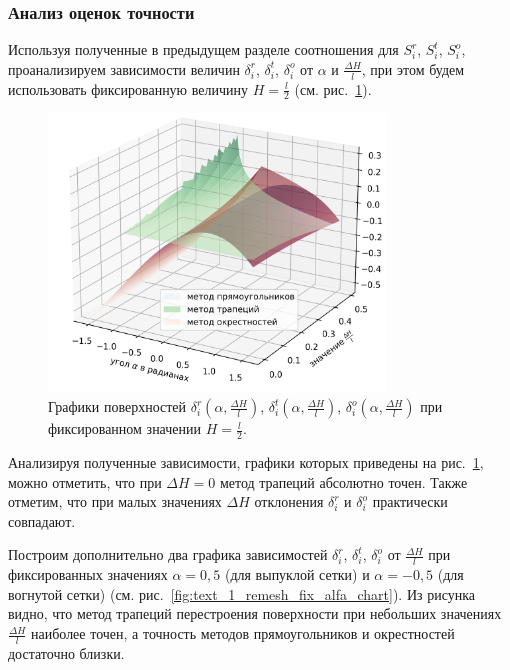\subsubsection{Анализ оценок точности}

Используя полученные в предыдущем разделе соотношения для $S_i^r$, $S_i^t$, $S_i^o$, проанализируем зависимости величин $\delta_i^r$, $\delta_i^t$, $\delta_i^o$ от $\alpha$ и $\frac{\Delta H}{l}$, при этом будем использовать фиксированную величину $H = \frac{l}{2}$ (см. рис.~\ref{fig:text_1_remesh_3d_main_chart}).

\begin{figure}[ht]
\centering
\includegraphics[width=0.8\textwidth]{fig/2dr_remesh_3d_chart.png}
\singlespacing
{}\caption{Графики поверхностей $\delta_i^r(\alpha, \frac{\Delta H}{l})$, $\delta_i^t(\alpha, \frac{\Delta H}{l})$, $\delta_i^o(\alpha, \frac{\Delta H}{l})$ при фиксированном значении $H = \frac{l}{2}$.}
\label{fig:text_1_remesh_3d_main_chart}
\end{figure}

Анализируя полученные зависимости, графики которых приведены на рис.~\ref{fig:text_1_remesh_3d_main_chart}, можно отметить, что при $\Delta H = 0$ метод трапеций абсолютно точен.
Также отметим, что при малых значениях $\Delta H$ отклонения $\delta_i^r$ и $\delta_i^o$ практически совпадают.

Построим дополнительно два графика зависимостей $\delta_i^r$, $\delta_i^t$, $\delta_i^o$ от $\frac{\Delta H}{l}$ при фиксированных значениях $\alpha = 0,5$ (для выпуклой сетки) и $\alpha = -0,5$ (для вогнутой сетки) (см. рис.~\ref{fig:text_1_remesh_fix_alfa_chart}).
Из рисунка видно, что метод трапеций перестроения поверхности при небольших значениях $\frac{\Delta H}{l}$ наиболее точен, а точность методов прямоугольников и окрестностей достаточно близки.

